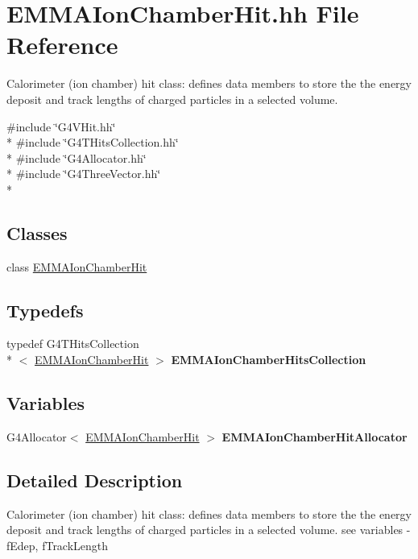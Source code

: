 \hypertarget{EMMAIonChamberHit_8hh}{\section{E\-M\-M\-A\-Ion\-Chamber\-Hit.\-hh File Reference}
\label{EMMAIonChamberHit_8hh}
}


Calorimeter (ion chamber) hit class\-: defines data members to store the the energy deposit and track lengths of charged particles in a selected volume.  


{\ttfamily \#include \char`\"{}G4\-V\-Hit.\-hh\char`\"{}}\\*
{\ttfamily \#include \char`\"{}G4\-T\-Hits\-Collection.\-hh\char`\"{}}\\*
{\ttfamily \#include \char`\"{}G4\-Allocator.\-hh\char`\"{}}\\*
{\ttfamily \#include \char`\"{}G4\-Three\-Vector.\-hh\char`\"{}}\\*
\subsection*{Classes}
\begin{DoxyCompactItemize}
\item 
class \hyperlink{classEMMAIonChamberHit}{E\-M\-M\-A\-Ion\-Chamber\-Hit}
\end{DoxyCompactItemize}
\subsection*{Typedefs}
\begin{DoxyCompactItemize}
\item 
\hypertarget{EMMAIonChamberHit_8hh_aad7a65851c3a8c13578e1a75f0b2d717}{typedef G4\-T\-Hits\-Collection\\*
$<$ \hyperlink{classEMMAIonChamberHit}{E\-M\-M\-A\-Ion\-Chamber\-Hit} $>$ {\bfseries E\-M\-M\-A\-Ion\-Chamber\-Hits\-Collection}}\label{EMMAIonChamberHit_8hh_aad7a65851c3a8c13578e1a75f0b2d717}

\end{DoxyCompactItemize}
\subsection*{Variables}
\begin{DoxyCompactItemize}
\item 
\hypertarget{EMMAIonChamberHit_8hh_adb78e92d0fb21fc2a8a5f8f8d03805ea}{G4\-Allocator$<$ \hyperlink{classEMMAIonChamberHit}{E\-M\-M\-A\-Ion\-Chamber\-Hit} $>$ {\bfseries E\-M\-M\-A\-Ion\-Chamber\-Hit\-Allocator}}\label{EMMAIonChamberHit_8hh_adb78e92d0fb21fc2a8a5f8f8d03805ea}

\end{DoxyCompactItemize}


\subsection{Detailed Description}
Calorimeter (ion chamber) hit class\-: defines data members to store the the energy deposit and track lengths of charged particles in a selected volume. see variables -\/ f\-Edep, f\-Track\-Length 